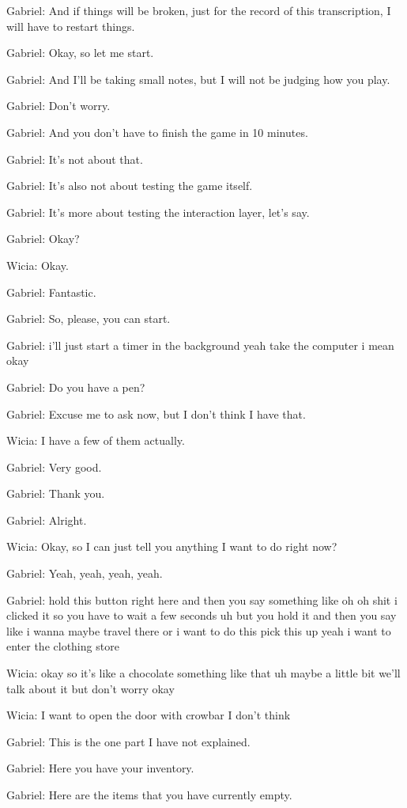 Gabriel: And if things will be broken, just for the record of this transcription, I will have to restart things.

Gabriel: Okay, so let me start.

Gabriel: And I'll be taking small notes, but I will not be judging how you play.

Gabriel: Don't worry.

Gabriel: And you don't have to finish the game in 10 minutes.

Gabriel: It's not about that.

Gabriel: It's also not about testing the game itself.

Gabriel: It's more about testing the interaction layer, let's say.

Gabriel: Okay?

Wicia: Okay.

Gabriel: Fantastic.

Gabriel: So, please, you can start.

Gabriel: i'll just start a timer in the background yeah take the computer i mean okay

Gabriel: Do you have a pen?

Gabriel: Excuse me to ask now, but I don't think I have that.

Wicia: I have a few of them actually.

Gabriel: Very good.

Gabriel: Thank you.

Gabriel: Alright.

Wicia: Okay, so I can just tell you anything I want to do right now?

Gabriel: Yeah, yeah, yeah, yeah.

Gabriel: hold this button right here and then you say something like oh oh shit i clicked it so you have to wait a few seconds uh but you hold it and then you say like i wanna maybe travel there or i want to do this pick this up yeah i want to enter the clothing store

Wicia: okay so it's like a chocolate something like that uh maybe a little bit we'll talk about it but don't worry okay

Wicia: I want to open the door with crowbar I don't think

Gabriel: This is the one part I have not explained.

Gabriel: Here you have your inventory.

Gabriel: Here are the items that you have currently empty.

